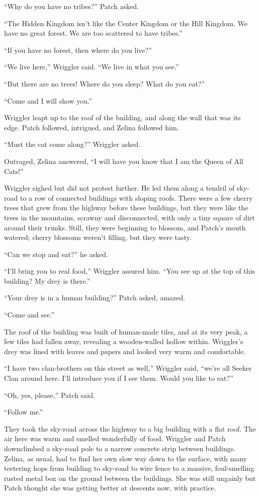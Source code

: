 \documentclass[ebook,oneside,openany,12pt]{memoir}
\begin{document}
“Why do you have no tribes?” Patch asked.

“The Hidden Kingdom isn’t like the Center Kingdom or the Hill
Kingdom. We have no great forest. We are too scattered to have
tribes.”

“If you have no forest, then where do you live?”

“We live here,” Wriggler said. “We live in what you see.”

“But there are no trees! Where do you sleep? What do you eat?”

“Come and I will show you.”

Wriggler leapt up to the roof of the building, and along the wall that
was its edge. Patch followed, intrigued, and Zelina followed him.

“Must the cat come along?” Wriggler asked.

Outraged, Zelina answered, “I will have you know that I am the Queen
of All Cats!”

Wriggler sighed but did not protest further. He led them along a
tendril of sky-road to a row of connected buildings with sloping
roofs. There were a few cherry trees that grew from the highway before
these buildings, but they were like the trees in the mountains,
scrawny and disconnected, with only a tiny square of dirt around their
trunks. Still, they were beginning to blossom, and Patch’s mouth
watered; cherry blossoms weren’t filling, but they were tasty.

“Can we stop and eat?” he asked.

“I’ll bring you to real food,” Wriggler assured him. “You see up at
the top of this building? My drey is there.”

“Your drey is in a human building?” Patch asked, amazed.

“Come and see.”

The roof of the building was built of human-made tiles, and at its
very peak, a few tiles had fallen away, revealing a wooden-walled
hollow within. Wriggler’s drey was lined with leaves and papers and
looked very warm and comfortable.

“I have two clan-brothers on this street as well,” Wriggler said,
“we’re all Seeker Clan around here. I’ll introduce you if I see
them. Would you like to eat?”

“Oh, yes, please,” Patch said.

“Follow me.”

They took the sky-road across the highway to a big building with a
flat roof. The air here was warm and smelled wonderfully of
food. Wriggler and Patch downclimbed a sky-road pole to a narrow
concrete strip between buildings. Zelina, as usual, had to find her
own slow way down to the surface, with many teetering hops from
building to sky-road to wire fence to a massive, foul-smelling rusted
metal box on the ground between the buildings. She was still ungainly
but Patch thought she was getting better at descents now, with
practice.
\end{document}
